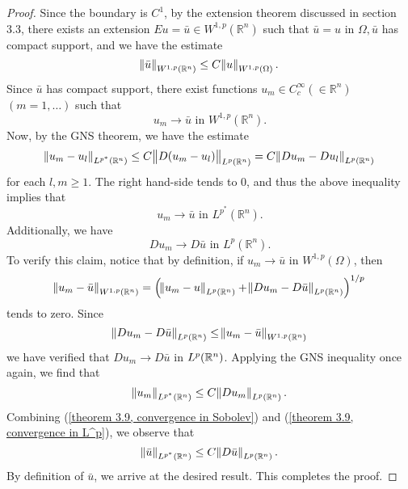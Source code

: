 \documentclass[10pt]{article}
\begin{document}
\begin{proof}
	Since the boundary is $C^1$, by the extension theorem discussed in section 3.3, there exists an extension $Eu = \bar{u} \in W^{1,p}(\mathbb{R}^n)$ such that $\bar{u} = u$ in $\Omega, \bar{u}$ has compact support, and we have the estimate 
	\begin{equation*}
		\displaystyle \norm{\bar{u}}_{W^{1,p}(\mathbb{R}^n)} \leq C\norm{u}_{W^{1,p}(\Omega)}.
	\end{equation*}
	Since $\bar{u}$ has compact support, there exist functions $u_m \in C_c^\infty(\in \mathbb{R}^n)$ $(m = 1,\dots)$ such that 
	\begin{equation*}
		\displaystyle u_m \to \bar{u} \textrm{ in } W^{1,p}(\mathbb{R}^n).
	\end{equation*}
	Now, by the GNS theorem, we have the estimate 
	\begin{equation*}
		\displaystyle \norm{u_m - u_l}_{L^{p^*}(\mathbb{R}^n)} \leq C \norm{D(u_m - u_l)}_{L^p(\mathbb{R}^n)} = C \norm{Du_m - Du_l}_{L^p(\mathbb{R}^n)}
	\end{equation*}
	for each $l,m \geq 1$. The right hand-side tends to $0$, and thus the above inequality implies that 
	\begin{equation}
		\label{theorem 3.9, convergence in Sobolev}
		\displaystyle u_m \to \bar{u} \textrm{ in } L^{p^*}(\mathbb{R}^n).
	\end{equation}
	Additionally, we have
	\begin{equation}
		\label{theorem 3.9, convergence in L^p}
		\displaystyle Du_m \to D\bar{u} \textrm{ in } L^p(\mathbb{R}^n). 
	\end{equation}
	To verify this claim, notice that by definition, if $u_m \to \bar{u}$ in $W^{1,p}(\Omega)$, then 
	\begin{equation*}
		\displaystyle \norm{u_m - \bar{u}}_{W^{1,p}(\mathbb{R}^n)} = \left( \norm{u_m - u}_{L^p(\mathbb{R}^n)} + \norm{Du_m - D\bar{u}}_{L^p(\mathbb{R}^n)} \right)^{1/p} 
	\end{equation*}
	tends to zero. Since 
	\begin{equation*}
		\displaystyle \norm{Du_m - D\bar{u}}_{L^p(\mathbb{R}^n)} \leq \norm{u_m - \bar{u}}_{W^{1,p}(\mathbb{R}^n)}
	\end{equation*}
	we have verified that $Du_m \to D\bar{u}$ in $L^p(\mathbb{R}^n)$. 
	Applying the GNS inequality once again, we find that 
	\begin{equation*}
		\displaystyle \norm{u_m}_{L^{p^*}(\mathbb{R}^n)} \leq C\norm{Du_m}_{L^p(\mathbb{R}^n)}.
	\end{equation*}
	Combining (\ref{theorem 3.9, convergence in Sobolev}) and (\ref{theorem 3.9, convergence in L^p}), we observe that 
	\begin{equation*}
		\displaystyle \norm{\bar{u}}_{L^{p^*}(\mathbb{R}^n)} \leq C \norm{D\bar{u}}_{L^p(\mathbb{R}^n)}.
	\end{equation*}
	By definition of $\bar{u}$, we arrive at the desired result. This completes the proof.
\end{proof}
\end{document}
